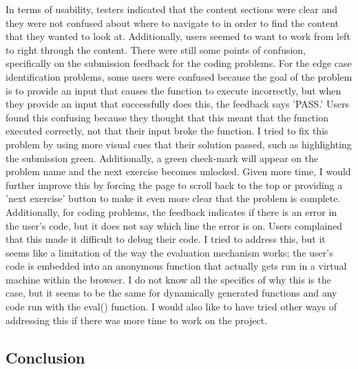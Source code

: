 \documentclass[10pt,twocolumn]{article}
\begin{document}
In terms of usability, testers indicated that the content sections were clear and they were not confused about where to 
navigate to in order to find the content that they wanted to look at. Additionally, users seemed to want to work from 
left to right through the content. There were still some points of confusion, specifically on the submission feedback 
for the coding problems. For the edge case identification problems, some users were confused because the goal of the 
problem is to provide an input that causes the function to execute incorrectly, but when they provide an input that 
successfully does this, the feedback says 'PASS.' Users found this confusing because they thought that this meant that 
the function executed correctly, not that their input broke the function. I tried to fix this problem by using more visual
cues that their solution passed, such as highlighting the submission green. Additionally, a green check-mark will appear 
on the problem name and the next exercise becomes unlocked. Given more time, I would further improve this by forcing the 
page to scroll back to the top or providing a 'next exercise' button to make it even more clear that the problem is complete. 
Additionally, for coding problems, the feedback indicates if there is an error in the user's code, but it does not say 
which line the error is on. Users complained that this made it difficult to debug their code. I tried to address this,
but it seems like a limitation of the way the evaluation mechanism works; the user's code is embedded into an anonymous 
function that actually gets run in a virtual machine within the browser. I do not know all the specifics of why this is 
the case, but it seems to be the same for dynamically generated functions and any code run with the eval() function. 
I would also like to have tried other ways of addressing this if there was more time to work on the project. 

\subsection{Conclusion}
\end{document}
